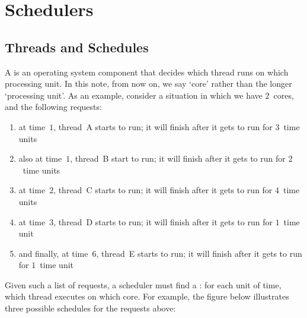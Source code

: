 \chapter{Schedulers}\label{ch:09-schedulers}

\section{Threads and Schedules}

\noindent
A  is an operating system component
  that decides which thread runs on which processing unit.
In this note, from now on, we say `core' rather than the longer `processing unit'.
As an example,
  consider a situation in which we have $2$~cores,
  and the following requests:
\begin{enumerate}
\item at time~$1$, thread~A starts to run;
  it will finish after it gets to run for $3$~time units
\item also at time~$1$, thread~B start to run;
  it will finish after it gets to run for $2$~time units
\item at time~$2$, thread~C starts to run;
  it will finish after it gets to run for $4$~time units
\item at time~$3$, thread~D starts to run;
  it will finish after it gets to run for $1$~time unit
\item and finally, at time~$6$, thread~E starts to run;
  it will finish after it gets to run for $1$~time unit
\end{enumerate}
Given such a list of requests,
  a scheduler must find a :
  for each unit of time, which thread executes on which core.
For example,
  the figure below illustrates three possible schedules for the requests above:
\begin{center}
\end{center}
